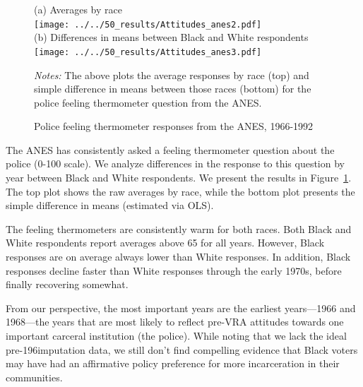 \documentclass[12pt]{article}
\begin{document}
 \begin{figure}[h!]
   	\begin{center}
   	\caption{Police feeling thermometer responses from the ANES, 1966-1992}
   		\small \vspace*{.05in}
   		\smallskip
			(a) Averages by race \\
   			\texttt{[image: ../../50\_results/Attitudes\_anes2.pdf]} \\
				\smallskip \smallskip
				(b) Differences in means between Black and White respondents \\
   			\texttt{[image: ../../50\_results/Attitudes\_anes3.pdf]}\\
   		\label{figure_anes}
   		\end{center}
  	\scriptsize{\emph{Notes:} The above plots the average responses by race (top) and simple difference in means between those races (bottom) for the police feeling thermometer question from the ANES.}
   \end{figure} \normalsize



The ANES has consistently asked a feeling thermometer question about the police (0-100 scale).
We analyze differences in the response to this question by year between Black and White respondents.  We present the results in Figure~\ref{figure_anes}.  The top plot shows the raw averages by race, while the bottom plot presents the simple difference in means (estimated via OLS).

The feeling thermometers are consistently warm for both races.  Both Black and White respondents report averages above 65 for all years.  However, Black responses are on average always lower than White responses.  In addition, Black responses decline faster than White responses through the early 1970s, before finally recovering somewhat.

From our perspective, the most important years are the earliest years---1966 and 1968---the years that are most likely to reflect pre-VRA attitudes towards one important carceral institution (the police).  While noting that we lack the ideal pre-196imputation data, we still don't find compelling evidence that Black voters may have had an affirmative policy preference for more incarceration in their communities.







\clearpage \newpage
\end{document}
